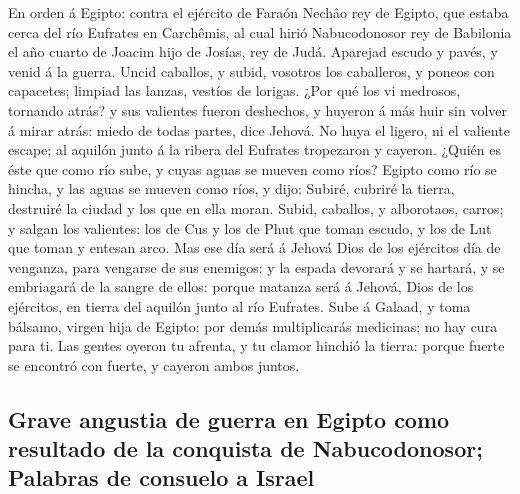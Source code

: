  En orden á Egipto: contra el ejército de Faraón Nechâo rey
de Egipto, que estaba cerca del río Eufrates en Carchêmis, al cual hirió
Nabucodonosor rey de Babilonia el año cuarto de Joacim hijo de Josías,
rey de Judá.  Aparejad escudo y pavés, y venid á la guerra.
 Uncid caballos, y subid, vosotros los caballeros, y poneos
con capacetes; limpiad las lanzas, vestíos de lorigas.  ¿Por
qué los vi medrosos, tornando atrás? y sus valientes fueron deshechos, y
huyeron á más huir sin volver á mirar atrás: miedo de todas partes, dice
Jehová.  No huya el ligero, ni el valiente escape; al
aquilón junto á la ribera del Eufrates tropezaron y cayeron.
 ¿Quién es éste que como río sube, y cuyas aguas se mueven
como ríos?  Egipto como río se hincha, y las aguas se mueven
como ríos, y dijo: Subiré, cubriré la tierra, destruiré la ciudad y los
que en ella moran.  Subid, caballos, y alborotaos, carros; y
salgan los valientes: los de Cus y los de Phut que toman escudo, y los
de Lut que toman y entesan arco.  Mas ese día será á Jehová
Dios de los ejércitos día de venganza, para vengarse de sus enemigos: y
la espada devorará y se hartará, y se embriagará de la sangre de ellos:
porque matanza será á Jehová, Dios de los ejércitos, en tierra del
aquilón junto al río Eufrates.  Sube á Galaad, y toma
bálsamo, virgen hija de Egipto: por demás multiplicarás medicinas; no
hay cura para ti.  Las gentes oyeron tu afrenta, y tu
clamor hinchió la tierra: porque fuerte se encontró con fuerte, y
cayeron ambos juntos.

\hypertarget{grave-angustia-de-guerra-en-egipto-como-resultado-de-la-conquista-de-nabucodonosor-palabras-de-consuelo-a-israel}{%
\subsection{Grave angustia de guerra en Egipto como resultado de la
conquista de Nabucodonosor; Palabras de consuelo a
Israel}\label{grave-angustia-de-guerra-en-egipto-como-resultado-de-la-conquista-de-nabucodonosor-palabras-de-consuelo-a-israel}}

